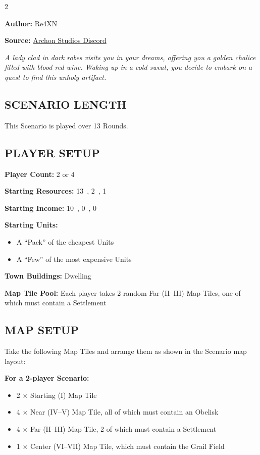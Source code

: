 
\begin{multicols*}{2}

\textbf{Author:} Re4XN

\textbf{Source:} \href{https://discord.com/channels/740870068178649108/1239631918643941509}{Archon Studios Discord}

\textit{A lady clad in dark robes visits you in your dreams, offering you a golden chalice filled with blood-red wine. Waking up in a cold sweat, you decide to embark on a quest to find this unholy artifact.}

\subsection*{\MakeUppercase{Scenario Length}}
This Scenario is played over 13 Rounds.

\subsection*{\MakeUppercase{Player Setup}}
\textbf{Player Count:} 2 or 4

\textbf{Starting Resources:} 13~, 2~, 1~

\textbf{Starting Income:} 10~, 0~, 0~

\textbf{Starting Units:}
\begin{itemize}
  \item A ``Pack'' of the cheapest  Units
  \item A ``Few'' of the most expensive  Units
\end{itemize}

\textbf{Town Buildings:}  Dwelling

\textbf{Map Tile Pool:} Each player takes 2 random Far (II--III) Map Tiles, one of which must contain a Settlement

\subsection*{\MakeUppercase{Map Setup}}
Take the following Map Tiles and arrange them as shown in the Scenario map layout:

\textbf{For a 2-player Scenario:}
\begin{itemize}
  \item 2 × Starting (I) Map Tile
  \item 4 × Near (IV--V) Map Tile, all of which must contain an Obelisk
  \item 4 × Far (II--III) Map Tile, 2 of which must contain a Settlement
  \item 1 × Center (VI--VII) Map Tile, which must contain the Grail Field
\end{itemize}


\end{multicols*}
